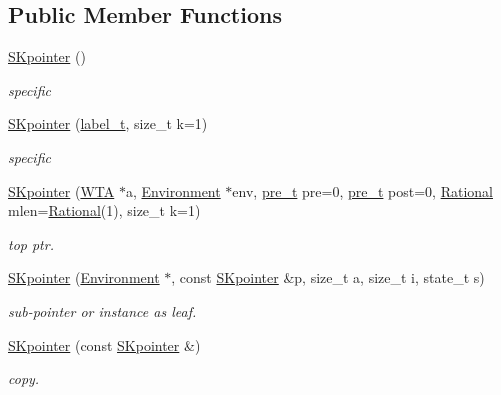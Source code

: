 \subsection*{Public Member Functions}
\begin{DoxyCompactItemize}
\item 
\mbox{\hyperlink{group__table_gaffcc41d2b1b8a85e3ea9acd3086321f5}{S\+Kpointer}} ()
\begin{DoxyCompactList}\small\item\em specific \end{DoxyCompactList}\item 
\mbox{\hyperlink{group__table_ga876c1101716f9aea625574f9be9b3da5}{S\+Kpointer}} (\mbox{\hyperlink{group__output_ga22fde970e635fcf63962743b2d5c441d}{label\+\_\+t}}, size\+\_\+t k=1)
\begin{DoxyCompactList}\small\item\em specific \end{DoxyCompactList}\item 
\mbox{\hyperlink{group__table_ga022b6998c4273e2da8128ccd2205a7f6}{S\+Kpointer}} (\mbox{\hyperlink{classWTA}{W\+TA}} $\ast$a, \mbox{\hyperlink{classEnvironment}{Environment}} $\ast$env, \mbox{\hyperlink{group__general_ga092fe8b972dfa977c2a0886720a7731e}{pre\+\_\+t}} pre=0, \mbox{\hyperlink{group__general_ga092fe8b972dfa977c2a0886720a7731e}{pre\+\_\+t}} post=0, \mbox{\hyperlink{classRational}{Rational}} mlen=\mbox{\hyperlink{classRational}{Rational}}(1), size\+\_\+t k=1)
\begin{DoxyCompactList}\small\item\em top ptr. \end{DoxyCompactList}\item 
\mbox{\hyperlink{group__table_gac3044b001a0035c0ea79ffac0a57d1d9}{S\+Kpointer}} (\mbox{\hyperlink{classEnvironment}{Environment}} $\ast$, const \mbox{\hyperlink{classSKpointer}{S\+Kpointer}} \&p, size\+\_\+t a, size\+\_\+t i, state\+\_\+t s)
\begin{DoxyCompactList}\small\item\em sub-\/pointer or instance as leaf. \end{DoxyCompactList}\item 
\mbox{\hyperlink{group__table_gae5dd2d6c4dde18082b5e20e34ead8bf3}{S\+Kpointer}} (const \mbox{\hyperlink{classSKpointer}{S\+Kpointer}} \&)
\begin{DoxyCompactList}\small\item\em copy. \end{DoxyCompactList}\item 

\end{DoxyCompactItemize}
